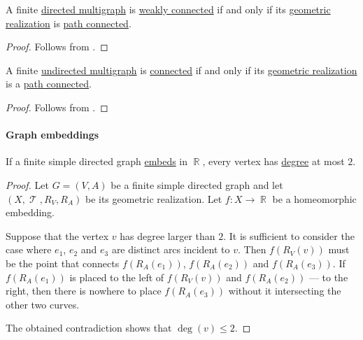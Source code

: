 \begin{corollary}\label{thm:directed_multigraph_geometric_realization_connectedness}
  A finite \hyperref[def:directed_multigraph]{directed multigraph} is \hyperref[def:graph_connectedness/weak]{weakly connected} if and only if its \hyperref[def:graph_geometric_realization/undirected]{geometric realization} is \hyperref[def:path_connected_space]{path connected}.
\end{corollary}
\begin{proof}
  Follows from .
\end{proof}

\begin{corollary}\label{thm:undirected_multigraph_geometric_realization_connectedness}
  A finite \hyperref[def:hypergraph/multigraph]{undirected multigraph} is \hyperref[def:graph_connectedness/undirected]{connected} if and only if its \hyperref[def:graph_geometric_realization/undirected]{geometric realization} is a \hyperref[def:path_connected_space]{path connected}.
\end{corollary}
\begin{proof}
  Follows from .
\end{proof}

\paragraph{Graph embeddings}

\begin{proposition}\label{thm:linear_directed multigraph_equivalence}
  If a finite simple directed graph \hyperref[def:graph_geometric_realization/embedding]{embeds} in \( \BbbR \), every vertex has \hyperref[def:graph_cardinality/directed_degree]{degree} at most \( 2 \).
\end{proposition}
\begin{proof}
  Let \( G = (V, A) \) be a finite simple directed graph and let \( (X, \mscrT, R_V, R_A) \) be its geometric realization. Let \( f: X \to \BbbR \) be a homeomorphic embedding.

  Suppose that the vertex \( v \) has degree larger than \( 2 \). It is sufficient to consider the case where \( e_1 \), \( e_2 \) and \( e_3 \) are distinct arcs incident to \( v \). Then \( f(R_V(v)) \) must be the point that connects \( f(R_A(e_1)) \), \( f(R_A(e_2)) \) and \( f(R_A(e_3)) \). If \( f(R_A(e_1)) \) is placed to the left of \( f(R_V(v)) \) and \( f(R_A(e_2)) \) --- to the right, then there is nowhere to place \( f(R_A(e_3)) \) without it intersecting the other two curves.

  The obtained contradiction shows that \( \deg(v) \leq 2 \).
\end{proof}

